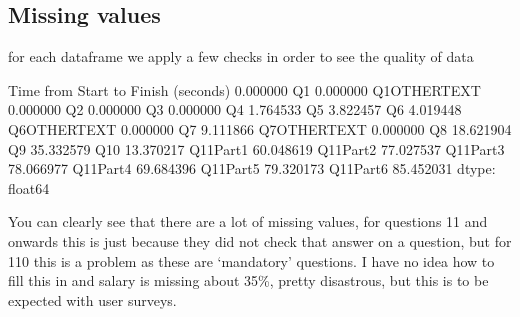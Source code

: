 \documentclass[letterpaper,10pt,english]{jupyterBook}
\begin{document}
\subsection{Missing values}
\label{\detokenize{c7_case_studies/UserSurvey:missing-values}}
\sphinxAtStartPar
for each dataframe we apply a few checks in order to see the quality of data

\begin{sphinxVerbatim}[commandchars=\\\{\}]
\PYG{p}{[}\PYG{p}{]}
\end{sphinxVerbatim}

\begin{sphinxVerbatim}[commandchars=\\\{\}]
Time from Start to Finish (seconds)     0.000000
Q1                                      0.000000
Q1\PYGZus{}OTHER\PYGZus{}TEXT                           0.000000
Q2                                      0.000000
Q3                                      0.000000
Q4                                      1.764533
Q5                                      3.822457
Q6                                      4.019448
Q6\PYGZus{}OTHER\PYGZus{}TEXT                           0.000000
Q7                                      9.111866
Q7\PYGZus{}OTHER\PYGZus{}TEXT                           0.000000
Q8                                     18.621904
Q9                                     35.332579
Q10                                    13.370217
Q11\PYGZus{}Part\PYGZus{}1                             60.048619
Q11\PYGZus{}Part\PYGZus{}2                             77.027537
Q11\PYGZus{}Part\PYGZus{}3                             78.066977
Q11\PYGZus{}Part\PYGZus{}4                             69.684396
Q11\PYGZus{}Part\PYGZus{}5                             79.320173
Q11\PYGZus{}Part\PYGZus{}6                             85.452031
dtype: float64
\end{sphinxVerbatim}

\sphinxAtStartPar
You can clearly see that there are a lot of missing values, for questions 11 and onwards this is just because they did not check that answer on a question, but for 1\sphinxhyphen{}10 this is a problem as these are ‘mandatory’ questions. I have no idea how to fill this in and salary is missing about 35\%, pretty disastrous, but this is to be expected with user surveys.
\end{document}
